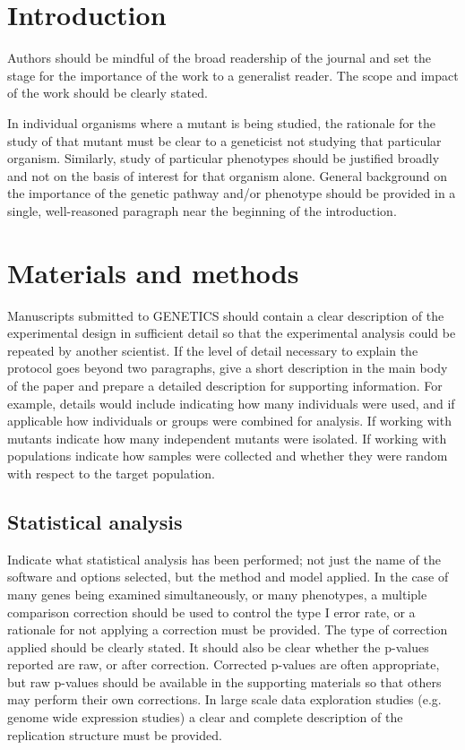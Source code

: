 \documentclass[10pt,twocolumn,twoside,lineno]{gsajnl}
\begin{document}
\section{Introduction}

Authors should be mindful of the broad readership of the journal and set the stage for the importance of the work to a generalist reader. The scope and impact of the work should be clearly stated.

In individual organisms where a mutant is being studied, the rationale for the study of that mutant must be clear to a geneticist not studying that particular organism. Similarly, study of particular phenotypes should be justified broadly and not on the basis of interest for that organism alone. General background on the importance of the genetic pathway and/or phenotype should be provided in a single, well-reasoned paragraph near the beginning of the introduction.

\section{Materials and methods}
\label{sec:materials:methods}

Manuscripts submitted to GENETICS should contain a clear description of the experimental design in sufficient detail so that the experimental analysis could be repeated by another scientist. If the level of detail necessary to explain the protocol goes beyond two paragraphs, give a short description in the main body of the paper and prepare a detailed description for supporting information.  For example, details would include indicating how many individuals were used, and if applicable how individuals or groups were combined for analysis. If working with mutants indicate how many independent mutants were isolated. If working with populations indicate how samples were collected and whether they were random with respect to the target population.


\subsection{Statistical analysis}

Indicate what statistical analysis has been performed; not just the name of the software and options selected, but the method and model applied. In the case of many genes being examined simultaneously, or many phenotypes, a multiple comparison correction should be used to control the type I error rate, or a rationale for not applying a correction must be provided. The type of correction applied should be clearly stated. It should also be clear whether the p-values reported are raw, or after correction. Corrected p-values are often appropriate, but raw p-values should be available in the supporting materials so that others may perform their own corrections. In large scale data exploration studies (e.g. genome wide expression studies) a clear and complete description of the replication structure must be provided.
\end{document}
